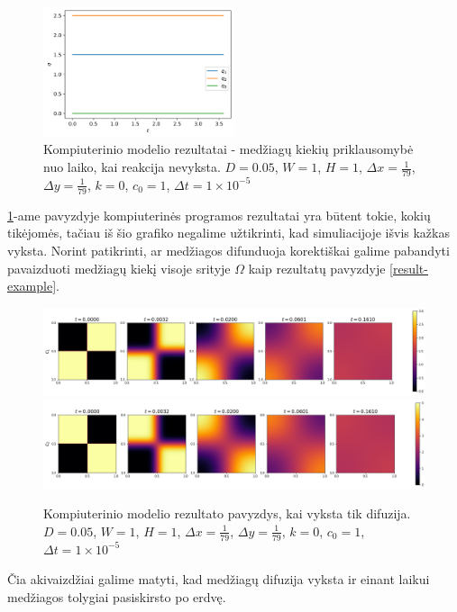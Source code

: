 \begin{figure}[h!]
    \centering
    \includegraphics[width=0.5\textwidth]{../assets/no-reaction.png}
    \caption{Kompiuterinio modelio rezultatai - medžiagų kiekių priklausomybė nuo laiko, kai reakcija nevyksta. $D = 0.05$, $W = 1$, $H = 1$, $\Delta x = \frac{1}{79}$, $\Delta y = \frac{1}{79}$, $k = 0$, $c_0 = 1$, $\Delta t = 1\times 10^{-5}$ }
    \label{no-reaction}
\end{figure}

\ref{no-reaction}-ame pavyzdyje kompiuterinės programos rezultatai yra būtent tokie, kokių tikėjomės, tačiau iš šio grafiko negalime užtikrinti, kad simuliacijoje išvis kažkas vyksta. Norint patikrinti, ar medžiagos difunduoja korektiškai galime pabandyti pavaizduoti medžiagų kiekį visoje srityje $\Omega$ kaip rezultatų pavyzdyje \eqref{result-example}.

\begin{figure}[h!]
\centering
\includegraphics[width=\textwidth]{../assets/only-diffusion-c1.png} \\
\includegraphics[width=\textwidth]{../assets/only-diffusion-c2.png}
\caption{Kompiuterinio modelio rezultato pavyzdys, kai vyksta tik difuzija. $D = 0.05$, $W = 1$, $H = 1$, $\Delta x = \frac{1}{79}$, $\Delta y = \frac{1}{79}$, $k = 0$, $c_0 = 1$, $\Delta t = 1\times 10^{-5}$ }
\label{only-diffusion}
\end{figure}

Čia akivaizdžiai galime matyti, kad medžiagų difuzija vyksta ir einant laikui medžiagos tolygiai pasiskirsto po erdvę.


